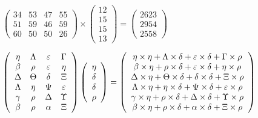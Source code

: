 \documentclass[12pt]{article}
\begin{document}
 

 
$\left( \begin{array}{ccccccccccccccc}
 34  & 
 53  & 
 47  & 
 55  \\ 
 51  & 
 59  & 
 46  & 
 59  \\ 
 60  & 
 50  & 
 50  & 
 26
\end{array}\right) \times
\left( \begin{array}{c}
 12  \\ 
 15  \\ 
 15  \\ 
 13
\end{array}\right)  =
\left( \begin{array}{c}
 2623  \\ 
 2954  \\ 
 2558
\end{array}\right)  $
 
$  %
 \left( \begin{array}
 {
 c
 c
 c
 c
 }
 \eta & 
 \Lambda & 
 \varepsilon & 
 \Gamma \\ 
 \beta & 
 \rho & 
 \varepsilon & 
 \eta \\ 
 \Delta & 
 \Theta & 
 \delta & 
                    \Xi \\ 
 \Lambda & 
 \eta & 
 \Psi & 
 \varepsilon \\ 
 \gamma & 
 \rho & 
 \Delta & 
 \Upsilon \\ 
 \beta & 
 \rho & 
 \alpha & 
                    \Xi
 \end{array} \right)
 \left( \begin{array}
 {
 c
 }
 \eta \\ 
 \delta \\ 
 \delta \\ 
 \rho
 \end{array} \right)
=
  \left( \begin{array}
 {
 c
 }
 \eta \times  \eta   +  \Lambda \times  \delta   +  \varepsilon \times  \delta   +  \Gamma \times  \rho \\ 
 \beta \times  \eta   +  \rho \times  \delta   +  \varepsilon \times  \delta   +  \eta \times  \rho \\ 
 \Delta \times  \eta   +  \Theta \times  \delta   +  \delta \times  \delta   +                     \Xi \times  \rho \\ 
 \Lambda \times  \eta   +  \eta \times  \delta   +  \Psi \times  \delta   +  \varepsilon \times  \rho \\ 
 \gamma \times  \eta   +  \rho \times  \delta   +  \Delta \times  \delta   +  \Upsilon \times  \rho \\ 
 \beta \times  \eta   +  \rho \times  \delta   +  \alpha \times  \delta   +                     \Xi \times  \rho
 \end{array} \right)
$
 
\end{document}
